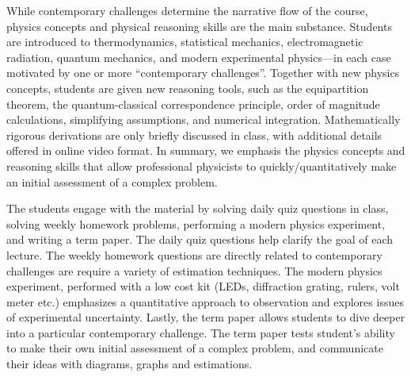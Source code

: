 \documentclass[english,aps,pra,reprint,noshowpacs,superscriptaddress]{revtex4-1}
\begin{document}
While contemporary challenges determine the narrative flow of the
course, physics concepts and physical reasoning skills are the main
substance. Students are introduced to thermodynamics, statistical
mechanics, electromagnetic radiation, quantum mechanics, and modern
experimental physics---in each case motivated by one or more
``contemporary challenges''. Together with new physics concepts,
students are given new reasoning tools, such as the equipartition
theorem, the quantum-classical correspondence principle, order of
magnitude calculations, simplifying assumptions, and numerical
integration. Mathematically rigorous derivations are only briefly
discussed in class, with additional details offered in online video
format. In summary, we emphasis the physics concepts and reasoning
skills that allow professional physicists to quickly/quantitatively
make an initial assessment of a complex problem.

The students engage with the material by solving daily quiz questions
in class, solving weekly homework problems, performing a modern
physics experiment, and writing a term paper. The daily quiz questions
help clarify the goal of each lecture. The weekly homework questions
are directly related to contemporary challenges are require a variety
of estimation techniques. The modern physics experiment, performed
with a low cost kit (LEDs, diffraction grating, rulers, volt meter
etc.) emphasizes a quantitative approach to observation and explores
issues of experimental uncertainty. Lastly, the term paper allows
students to dive deeper into a particular contemporary challenge. The
term paper tests student's ability to make their own initial
assessment of a complex problem, and communicate their ideas with
diagrams, graphs and estimations.


\end{document}
